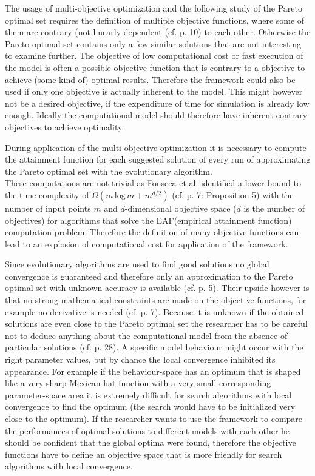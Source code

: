 \documentclass[12pt,twoside]{article}
\theoremstyle{plain}
\theoremstyle{definition}
\theoremstyle{remark}
\begin{document}
The usage of multi-objective optimization and the following study of the Pareto optimal set requires the definition of multiple objective functions, where some of them are contrary (not linearly dependent (cf. \cite{doncieux2015multi} p. 10) to each other. Otherwise the Pareto optimal set contains only a few similar solutions that are not interesting to examine further. The objective of low computational cost or fast execution of the model is often a possible objective function that is contrary to a objective to achieve (some kind of) optimal results. Therefore the framework could also be used if only one objective is actually inherent to the model. This might however not be a desired objective, if the expenditure of time for simulation is already low enough. Ideally the computational model should therefore have inherent contrary objectives to achieve optimality.\medskip

During application of the multi-objective optimization it is necessary to compute the attainment function for each suggested solution of every run of approximating the Pareto optimal set with the evolutionary algorithm.\\
These computations are not trivial as Fonseca et al. identified a lower bound to the time complexity of $\Omega(m\,\mbox{log}\,m+m^{d/2})$ (cf. \cite{fonseca2011computation} p. 7: Proposition 5) with the number of input points $m$ and $d$-dimensional objective space ($d$ is the number of objectives) for algorithms that solve the EAF(empirical attainment function) computation problem.
Therefore the definition of many objective functions can lead to an explosion of computational cost for application of the framework.\medskip

Since evolutionary algorithms are used to find good solutions no global convergence is guaranteed and therefore only an approximation to the Pareto optimal set with unknown accuracy is available (cf. \cite{doncieux2015multi} p. 5). Their upside however is that no strong mathematical constraints are made on the objective functions, for example no derivative is needed (cf. \cite{doncieux2015multi} p. 7).
Because it is unknown if the obtained solutions are even close to the Pareto optimal set the researcher has to be careful not to deduce anything about the computational model from the absence of particular solutions (cf. \cite{doncieux2015multi} p. 28).
A specific model behaviour might occur with the right parameter values, but by chance the local convergence inhibited its appearance.
For example if the behaviour-space has an optimum that is shaped like a very sharp Mexican hat function with a very small corresponding parameter-space area it is extremely difficult for search algorithms with local convergence to find the optimum (the search would have to be initialized very close to the optimum).
If the researcher wants to use the framework to compare the performances of optimal solutions to different models with each other he should be confident that the global optima were found, therefore the objective functions have to define an objective space that is more friendly for search algorithms with local convergence.\medskip
\end{document}
